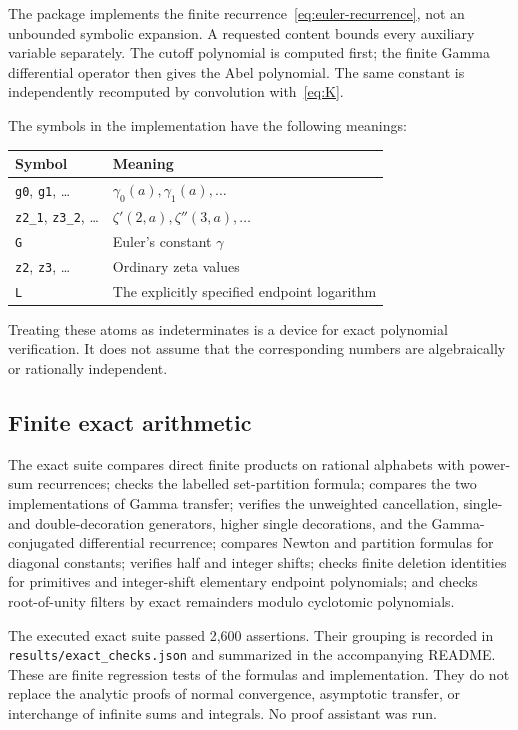 \documentclass[11pt,oneside]{article}
\numberwithin{equation}{section}
\theoremstyle{definition}
\theoremstyle{remark}
\newcommand{\src}[1]{\nolinkurl{#1}}
\begin{document}
The package implements the finite recurrence~\eqref{eq:euler-recurrence}, not
an unbounded symbolic expansion. A requested content bounds every auxiliary
variable separately. The cutoff polynomial is computed first; the finite
Gamma differential operator then gives the Abel polynomial. The same
constant is independently recomputed by convolution with~\eqref{eq:K}.

The symbols in the implementation have the following meanings:
\begin{center}
\begin{tabular}{ll}
\toprule
Symbol & Meaning\\
\midrule
\texttt{g0}, \texttt{g1}, \ldots & $\gamma_0(a),\gamma_1(a),\ldots$\\
\texttt{z2\_1}, \texttt{z3\_2}, \ldots
 & $\zeta'(2,a),\zeta''(3,a),\ldots$\\
\texttt{G} & Euler's constant $\gamma$\\
\texttt{z2}, \texttt{z3}, \ldots & Ordinary zeta values\\
\texttt{L} & The explicitly specified endpoint logarithm\\
\bottomrule
\end{tabular}
\end{center}
Treating these atoms as indeterminates is a device for exact polynomial
verification. It does not assume that the corresponding numbers are
algebraically or rationally independent.

\subsection{Finite exact arithmetic}

The exact suite compares direct finite products on rational alphabets with
power-sum recurrences;
checks the labelled set-partition formula; compares the two implementations
of Gamma transfer; verifies the unweighted cancellation, single- and
double-decoration generators, higher single decorations, and the
Gamma-conjugated differential recurrence; compares Newton and partition
formulas for diagonal constants; verifies half and integer shifts; checks
finite deletion identities for primitives and integer-shift elementary
endpoint polynomials; and checks root-of-unity filters by exact remainders
modulo cyclotomic polynomials.

The executed exact suite passed 2,600 assertions. Their grouping is recorded
in \src{results/exact_checks.json} and summarized in the accompanying README. These are finite regression tests of
the formulas and implementation. They do not replace the analytic proofs of
normal convergence, asymptotic transfer, or interchange of infinite sums and
integrals. No proof assistant was run.
\end{document}
